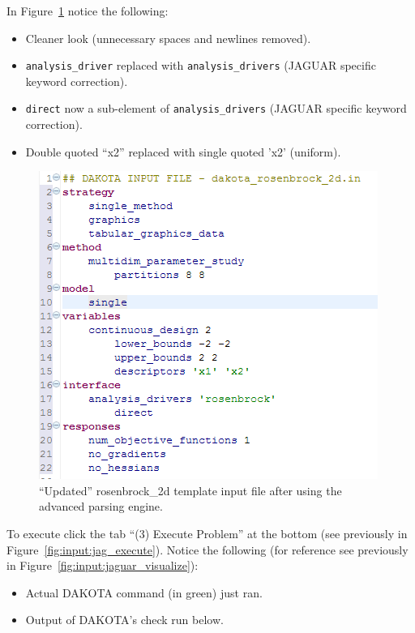 In Figure~\ref{fig:input:3fixed} notice the following:
\begin{itemize}
\item Cleaner look (unnecessary spaces and newlines removed).
\item \texttt{analysis\_driver} replaced with \texttt{analysis\_drivers} (JAGUAR specific keyword correction).
\item \texttt{direct} now a sub-element of \texttt{analysis\_drivers} (JAGUAR specific keyword correction).
\item Double quoted ``x2'' replaced with single quoted 'x2' (uniform).
\end{itemize}
\begin{figure}[htbp]
  \centering
  \includegraphics[scale=0.6]{images/3fixed}
  \caption{``Updated'' rosenbrock\_2d template input file after using the advanced parsing engine.}
  \label{fig:input:3fixed}
\end{figure}      


To execute click the tab ``(3) Execute Problem'' at the bottom (see previously in Figure~\ref{fig:input:jag_execute}). 
Notice the following (for reference see previously in Figure~\ref{fig:input:jaguar_visualize}):
\begin{itemize}
\item Actual DAKOTA command (in green) just ran.
\item Output of DAKOTA's check run below.
\end{itemize}

